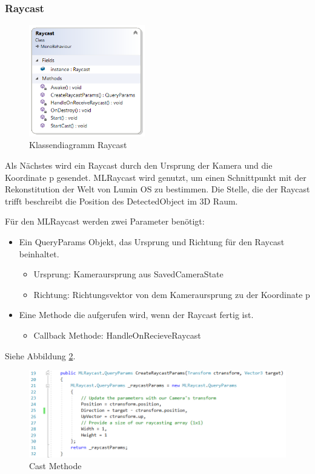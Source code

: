 \subsubsection{Raycast}

\begin{figure}[H]
	\centering
	\includegraphics[width=0.45\textwidth]{images/dia_raycast.PNG}
	\caption[]{Klassendiagramm Raycast}
	\label{dia:raycast}
\end{figure}

Als Nächstes wird ein Raycast durch den Ursprung der Kamera und die Koordinate p gesendet. MLRaycast wird genutzt, um einen Schnittpunkt mit der Rekonstitution der Welt von Lumin OS zu bestimmen. Die Stelle, die der Raycast trifft beschreibt die Position des DetectedObject im 3D Raum.

Für den MLRaycast werden zwei Parameter benötigt:
\begin{itemize}
	\item Ein QueryParams Objekt, das Ursprung und Richtung für den Raycast beinhaltet.
	\begin{itemize}
		\item Ursprung: Kameraursprung aus SavedCameraState
		\item Richtung: Richtungsvektor von dem Kameraursprung zu der Koordinate p
	\end{itemize}
	\item Eine Methode die aufgerufen wird, wenn der Raycast fertig ist. 
	\begin{itemize}
		\item Callback Methode: HandleOnRecieveRaycast
	\end{itemize}
\end{itemize}

Siehe Abbildung \ref{code:raycastparams}.

\begin{figure}[H]
	\centering
	\includegraphics[width=1\textwidth]{images/code_raycastparams.PNG}
	\caption[]{Cast Methode}
	\label{code:raycastparams}
\end{figure}

